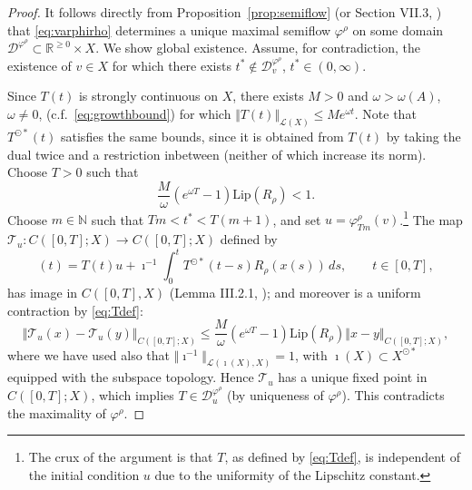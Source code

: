 \documentclass[a4paper, 12pt, oneside, reqno, notitlepage]{amsart}
\theoremstyle{plain}
\theoremstyle{definition}
\theoremstyle{remark}
\newcommand{\lip}{\mathrm{Lip}}
\begin{document}
\begin{proof}
    It follows directly from Proposition~\ref{prop:semiflow} (or Section VII.3, \cite{diekmann2012delay}) that \eqref{eq:varphirho} determines a unique maximal semiflow $\varphi^\rho$ on some domain $\mathcal{D}^{\varphi^\rho} \subset \mathbb{R}^{\geq 0} \times X$.
    We show global existence.
    Assume, for contradiction, the existence of $v \in X$ for which there exists $t^* \notin \mathcal{D}^{\varphi^\rho}_v$, $t^*  \in (0,\infty)$.
    
    Since $T(t)$ is strongly continuous on $X$, there exists $M > 0$ and $\omega > \omega(A)$, $\omega \neq 0$, (c.f.\ \eqref{eq:growthbound}) for which  $\Vert T(t)\Vert_{\mathcal{L}(X)} \leq Me^{\omega t}$.
    Note that $T^{\odot *}(t)$ satisfies the same bounds, since it is obtained from $T(t)$ by taking the dual twice and a restriction inbetween (neither of which increase its norm). 
    Choose $T > 0$ such that
    \begin{equation}
        \frac{M}{\omega}\left( e^{\omega T } - 1 \right) \lip(R_\rho) < 1.
        \label{eq:Tdef}
    \end{equation}
    Choose $m \in \mathbb{N}$ such that $Tm < t^* < T(m+1)$, and set $u = \varphi^\rho_{Tm}(v)$.\footnote{The crux of the argument is that $T$, as defined by \eqref{eq:Tdef}, is independent of the initial condition $u$ due to the uniformity of the Lipschitz constant.}
    The map $\mathcal{T}_u :   C([0,T];X) \to C([0,T];X)$ defined by 
    \begin{displaymath}
        [\mathcal{T}_u (x)](t) = T(t) u + \imath^{-1} \int_0^t T^{\odot *} (t-s) R_\rho ( x(s))\, ds, \qquad t \in [0,T],
    \end{displaymath}
    has image in $C([0,T],X)$ (Lemma III.2.1, \cite{diekmann2012delay}); and moreover is a uniform contraction by \eqref{eq:Tdef}:
    \begin{displaymath}
        \Vert \mathcal{T}_u (x) - \mathcal{T}_u(y) \Vert_{C([0,T];X)} \leq \frac{M}{\omega}\left( e^{\omega T } - 1 \right) \lip(R_\rho) \Vert x-y \Vert_{C([0,T];X)},
    \end{displaymath}
    where we have used also that $\Vert \imath^{-1} \Vert_{\mathcal{L}(\imath(X),X)} =1$, with $\imath(X) \subset X^{\odot *}$ equipped with the subspace topology.
    Hence $\mathcal{T}_u$ has a unique fixed point in $C([0,T];X)$, which implies $T \in \mathcal{D}^{\varphi^{\rho}}_u$ (by uniqueness of $\varphi^\rho$).
    This contradicts the maximality of $\varphi^\rho$.
\end{proof}
\end{document}
